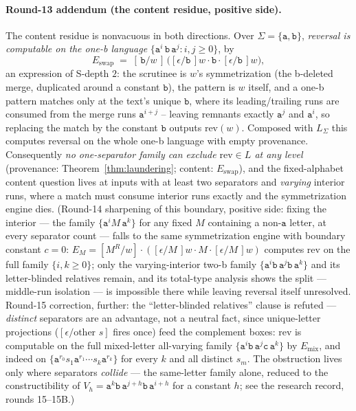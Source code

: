 \paragraph{Round-13 addendum (the content residue, positive side).}
The content residue is nonvacuous in both directions.  Over
$\Sigma = \{\mathtt a, \mathtt b\}$, \emph{reversal is computable on
the one-b language} $\{\mathtt a^{i}\,\mathtt b\,\mathtt a^{j} :
i, j \geq 0\}$, by
\[
E_{\mathrm{swap}} \;=\; [\,\mathtt b/w\,]\,
\bigl([\epsilon/\mathtt b\,]w \cdot \mathtt b \cdot
[\epsilon/\mathtt b\,]w\bigr),
\]
an expression of S-depth $2$: the scrutinee is $w$'s symmetrization
(the b-deleted merge, duplicated around a constant $\mathtt b$),
the pattern is $w$ itself, and a one-b pattern matches only at the
text's unique $\mathtt b$, where its leading/trailing runs are
consumed from the merge runs $\mathtt a^{i+j}$ -- leaving remnants
exactly $\mathtt a^{j}$ and $\mathtt a^{i}$, so replacing the match
by the constant $\mathtt b$ outputs $\mathrm{rev}(w)$.  Composed
with $L_\Sigma$ this computes reversal on the whole one-b language
with empty provenance.  Consequently \emph{no one-separator family
can exclude $\mathrm{rev} \in L$ at any level} (provenance:
Theorem~\ref{thm:laundering}; content: $E_{\mathrm{swap}}$), and the
fixed-alphabet content question lives at inputs with at
least two separators and \emph{varying} interior runs, where a match
must consume interior runs exactly and the symmetrization engine
dies.  (Round-14 sharpening of this boundary, positive side: fixing
the interior — the family $\{\mathtt a^{i} M \,\mathtt a^{k}\}$ for
any fixed $M$ containing a non-$\mathtt a$ letter, at every separator
count — falls to the same symmetrization engine with boundary
constant $c = 0$: $E_M = [M^{R}/w]\cdot
([\epsilon/M\,]w \cdot M \cdot [\epsilon/M\,]w)$ computes
$\mathrm{rev}$ on the full family $\{i, k \geq 0\}$; only the
varying-interior two-b family $\{\mathtt a^{i}\mathtt b\,\mathtt
a^{j}\mathtt b\,\mathtt a^{k}\}$ and its letter-blinded relatives
remain, and its total-type analysis shows the split — middle-run
isolation — is impossible there while leaving reversal itself
unresolved.  Round-15 correction, further: the ``letter-blinded
relatives'' clause is refuted — \emph{distinct} separators are an
advantage, not a neutral fact, since unique-letter projections
($[\epsilon/\text{other }s]$ fires once) feed the complement boxes:
$\mathrm{rev}$ is computable on the full mixed-letter all-varying
family $\{\mathtt a^{i}\mathtt b\,\mathtt a^{j}\mathtt c\,\mathtt
a^{k}\}$ by $E_{\mathrm{mix}}$, and indeed on
$\{\mathtt a^{r_0} s_1 \mathtt a^{r_1} \cdots s_k \mathtt a^{r_k}\}$
for every $k$ and all distinct $s_m$.  The obstruction lives only
where separators \emph{collide} — the same-letter family alone,
reduced to the constructibility of $V_h = \mathtt a^{k}\mathtt b\,
\mathtt a^{j+h}\mathtt b\,\mathtt a^{i+h}$ for a constant $h$; see
the research record, rounds 15--15B.)


